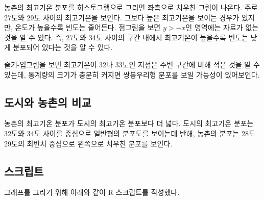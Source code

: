 농촌의 최고기온 분포를 히스토그램으로 그리면 좌측으로 치우친 그림이 나온다.
주로 27도와 29도 사이의 최고기온을 보인다. 그보다 높은 최고기온을 보이는 경우가 있지만,
온도가 높을수록 빈도는 줄어든다. 점그림을 보면 $y > -x$인 영역에는 자료가 없는
것을 알 수 있다. 즉, 27도와 34도 사이의 구간 내에서 최고기온이 높을수록 빈도는 낮게
분포되어 있다는 것을 알 수 있다.


줄기-입그림을 보면 최고기온이 32나 33도인 지점은 주변 구간에 비해 적은 것을 알 수
있는데, 통계량의 크기가 충분히 커지면 쌍봉우리형 분포를 보일 가능성이 있어보인다.

\subsection{도시와 농촌의 비교}

농촌의 최고기온 분포가 도시의 최고기온 분포보다 더 넓다. 도시의 최고기온 분포는
32도와 34도 사이를 중심으로 일반형의 분포도를 보이는데 반해, 농촌의 분포는
28도 29도의 최빈치 중심으로 왼쪽으로 치우친 분포를 보인다.

\subsection{스크립트}
그래프를 그리기 위해 아래와 같이 R 스크립트를 작성했다.


